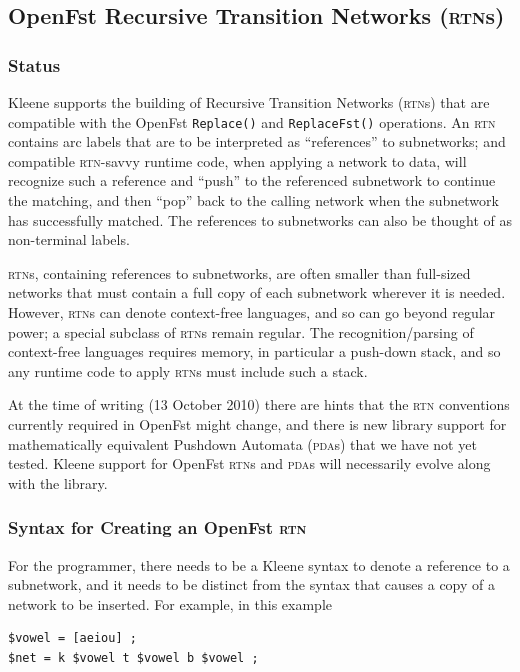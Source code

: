 \documentclass[letterpaper,12pt]{article}
\newcommand{\acro}{\textsc}
\begin{document}
\subsection{OpenFst Recursive Transition Networks (\acro{rtn}s)}

\subsubsection{Status}

Kleene supports the building of Recursive Transition Networks
(\acro{rtn}s) that are compatible with the OpenFst \texttt{Replace()} and
\texttt{ReplaceFst()} operations.  An \acro{rtn} contains arc labels that
are to be interpreted as ``references'' to subnetworks; and compatible
\acro{rtn}-savvy runtime code, when applying a network to data, will
recognize such a reference and ``push'' to the referenced subnetwork to
continue the matching, and then ``pop'' back to the calling network when
the subnetwork has successfully matched.  The references to subnetworks
can also be thought of as non-terminal labels.

\acro{rtn}s, containing references to subnetworks, are often smaller than
full-sized networks that must contain a full copy of each subnetwork
wherever it is needed.  However, \acro{rtn}s can denote context-free
languages, and so can go beyond regular power; a special subclass of
\acro{rtn}s remain regular.  The recognition/parsing of context-free
languages requires memory, in particular a push-down stack, and so any
runtime code to apply \acro{rtn}s must include such a stack.

At the time of writing (13 October 2010) there are hints that the
\acro{rtn} conventions currently required in OpenFst might change, and
there is new library support for mathematically equivalent Pushdown
Automata (\acro{pda}s) that we have not yet tested.  Kleene support for
OpenFst \acro{rtn}s and \acro{pda}s will necessarily evolve along with
the library.

\subsubsection{Syntax for Creating an OpenFst \acro{rtn}}

For the programmer, there needs to be a Kleene syntax to denote a
reference to a subnetwork, and it needs to be distinct from the syntax
that causes a copy of a network to be inserted.  For example, in this
example

\begin{Verbatim}[fontsize=\small]
$vowel = [aeiou] ;
$net = k $vowel t $vowel b $vowel ;
\end{Verbatim}
\end{document}
